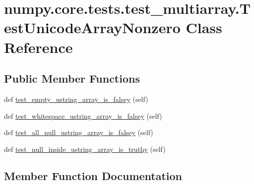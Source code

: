 \hypertarget{classnumpy_1_1core_1_1tests_1_1test__multiarray_1_1TestUnicodeArrayNonzero}{}\section{numpy.\+core.\+tests.\+test\+\_\+multiarray.\+Test\+Unicode\+Array\+Nonzero Class Reference}
\label{classnumpy_1_1core_1_1tests_1_1test__multiarray_1_1TestUnicodeArrayNonzero}
\subsection*{Public Member Functions}
\begin{DoxyCompactItemize}
\item 
def \hyperlink{classnumpy_1_1core_1_1tests_1_1test__multiarray_1_1TestUnicodeArrayNonzero_a19f696827c0a78aa69a361b331fc02c4}{test\+\_\+empty\+\_\+ustring\+\_\+array\+\_\+is\+\_\+falsey} (self)
\item 
def \hyperlink{classnumpy_1_1core_1_1tests_1_1test__multiarray_1_1TestUnicodeArrayNonzero_afbefd38caf32164a0ed8ac42205dc0e6}{test\+\_\+whitespace\+\_\+ustring\+\_\+array\+\_\+is\+\_\+falsey} (self)
\item 
def \hyperlink{classnumpy_1_1core_1_1tests_1_1test__multiarray_1_1TestUnicodeArrayNonzero_abb44ce14b4f9501c45c50ec4bd5fb1b8}{test\+\_\+all\+\_\+null\+\_\+ustring\+\_\+array\+\_\+is\+\_\+falsey} (self)
\item 
def \hyperlink{classnumpy_1_1core_1_1tests_1_1test__multiarray_1_1TestUnicodeArrayNonzero_ab672ca12865520cec01d244504f4c9ad}{test\+\_\+null\+\_\+inside\+\_\+ustring\+\_\+array\+\_\+is\+\_\+truthy} (self)
\end{DoxyCompactItemize}


\subsection{Member Function Documentation}
\mbox{\label{classnumpy_1_1core_1_1tests_1_1test__multiarray_1_1TestUnicodeArrayNonzero_abb44ce14b4f9501c45c50ec4bd5fb1b8}} 
